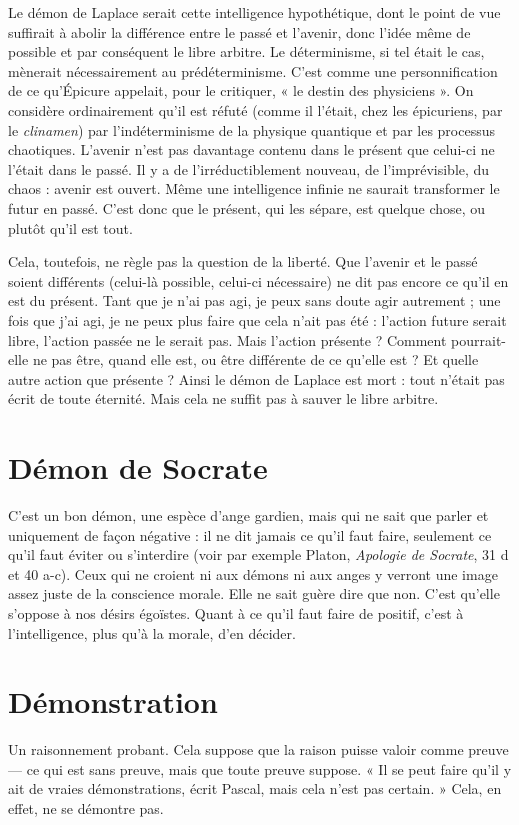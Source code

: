 Le démon de Laplace serait cette intelligence hypothétique, dont le point
de vue suffirait à abolir la différence entre le passé et l’avenir, donc l’idée même
de possible et par conséquent le libre arbitre. Le déterminisme, si tel était le cas,
mènerait nécessairement au prédéterminisme. C’est comme une personnification
de ce qu'Épicure appelait, pour le critiquer, « le destin des physiciens ».
On considère ordinairement qu’il est réfuté (comme il l'était, chez les épicuriens,
par le {\it clinamen}) par l’indéterminisme de la physique quantique et par les
processus chaotiques. L'avenir n’est pas davantage contenu dans le présent que
celui-ci ne l'était dans le passé. Il y a de l’irréductiblement nouveau, de l’imprévisible,
du chaos : avenir est ouvert. Même une intelligence infinie ne saurait
transformer le futur en passé. C’est donc que le présent, qui les sépare, est
quelque chose, ou plutôt qu’il est tout.

Cela, toutefois, ne règle pas la question de la liberté. Que l’avenir et le passé
soient différents (celui-là possible, celui-ci nécessaire) ne dit pas encore ce qu’il
en est du présent. Tant que je n’ai pas agi, je peux sans doute agir autrement ;
une fois que j'ai agi, je ne peux plus faire que cela n’ait pas été : l’action future
serait libre, l’action passée ne le serait pas. Mais l’action présente ? Comment
pourrait-elle ne pas être, quand elle est, ou être différente de ce qu’elle est ? Et
quelle autre action que présente ? Ainsi le démon de Laplace est mort : tout
n’était pas écrit de toute éternité. Mais cela ne suffit pas à sauver le libre arbitre.

\section{Démon de Socrate}
C’est un bon démon, une espèce d’ange gardien,
mais qui ne sait que parler et uniquement de
façon négative : il ne dit jamais ce qu’il faut faire, seulement ce qu’il faut éviter
ou s’interdire (voir par exemple Platon, {\it Apologie de Socrate}, 31 d et 40 a-c).
Ceux qui ne croient ni aux démons ni aux anges y verront une image assez juste
de la conscience morale. Elle ne sait guère dire que non. C’est qu’elle s’oppose
à nos désirs égoïstes. Quant à ce qu’il faut faire de positif, c’est à l’intelligence,
plus qu’à la morale, d’en décider.

\section{Démonstration}
Un raisonnement probant. Cela suppose que la raison
puisse valoir comme preuve — ce qui est sans preuve,
mais que toute preuve suppose. « Il se peut faire qu’il y ait de vraies démonstrations,
écrit Pascal, mais cela n’est pas certain. » Cela, en effet, ne se démontre
pas.

